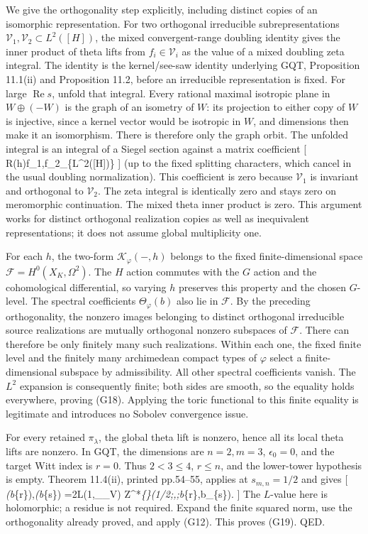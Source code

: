 \documentclass[11pt,a4paper]{article}
\theoremstyle{definition}
\begin{document}
We give the orthogonality step explicitly, including distinct copies of
an isomorphic representation. For two orthogonal irreducible
subrepresentations \(\mathcal V_1,\mathcal V_2\subset L^2([H])\), the
mixed convergent-range doubling identity gives the inner product of
theta lifts from \(f_i\in\mathcal V_i\) as the value of a mixed doubling
zeta integral. The identity is the kernel/see-saw identity underlying
GQT, Proposition 11.1(ii) and Proposition 11.2, before an irreducible
representation is fixed. For large \(\operatorname{Re}s\), unfold that
integral. Every rational maximal isotropic plane in \(W\oplus(-W)\) is
the graph of an isometry of \(W\): its projection to either copy of
\(W\) is injective, since a kernel vector would be isotropic in \(W\),
and dimensions then make it an isomorphism. There is therefore only the
graph orbit. The unfolded integral is an integral of a Siegel section
against a matrix coefficient {[}
\langle R(h)f\_1,f\_2\rangle\_\{L\^{}2({[}H{]})\} {]} (up to the fixed
splitting characters, which cancel in the usual doubling normalization).
This coefficient is zero because \(\mathcal V_1\) is invariant and
orthogonal to \(\mathcal V_2\). The zeta integral is identically zero
and stays zero on meromorphic continuation. The mixed theta inner
product is zero. This argument works for distinct orthogonal realization
copies as well as inequivalent representations; it does not assume
global multiplicity one.

For each \(h\), the two-form \(\mathcal K_\varphi(-,h)\) belongs to the
fixed finite-dimensional space \(\mathcal F=H^0(X_K,\Omega^2)\). The
\(H\) action commutes with the \(G\) action and the cohomological
differential, so varying \(h\) preserves this property and the chosen
\(G\)-level. The spectral coefficients \(\Theta_\varphi(b)\) also lie in
\(\mathcal F\). By the preceding orthogonality, the nonzero images
belonging to distinct orthogonal irreducible source realizations are
mutually orthogonal nonzero subspaces of \(\mathcal F\). There can
therefore be only finitely many such realizations. Within each one, the
fixed finite level and the finitely many archimedean compact types of
\(\varphi\) select a finite-dimensional subspace by admissibility. All
other spectral coefficients vanish. The \(L^2\) expansion is
consequently finite; both sides are smooth, so the equality holds
everywhere, proving (G18). Applying the toric functional to this finite
equality is legitimate and introduces no Sobolev convergence issue.

For every retained \(\pi_\lambda\), the global theta lift is nonzero,
hence all its local theta lifts are nonzero. In GQT, the dimensions are
\(n=2,m=3\), \(\epsilon_0=0\), and the target Witt index is \(r=0\).
Thus \(2<3\le4\), \(r\le n\), and the lower-tower hypothesis is empty.
Theorem 11.4(ii), printed pp.54--55, applies at \(s_{m,n}=1/2\) and
gives {[}
\langle\Theta\emph{\phi(b}\{\lambda r\}),\Theta\emph{\phi(b}\{\lambda s\})\rangle
=2L(1,\pi\_\lambda\times\chi\_V)
\mathcal Z\^{}*\emph{\{\lambda\}(1/2;\phi,\phi;b}\{\lambda r\},b\_\{\lambda s\}).
{]} The \(L\)-value here is holomorphic; a residue is not required.
Expand the finite squared norm, use the orthogonality already proved,
and apply (G12). This proves (G19). QED.
\end{document}
